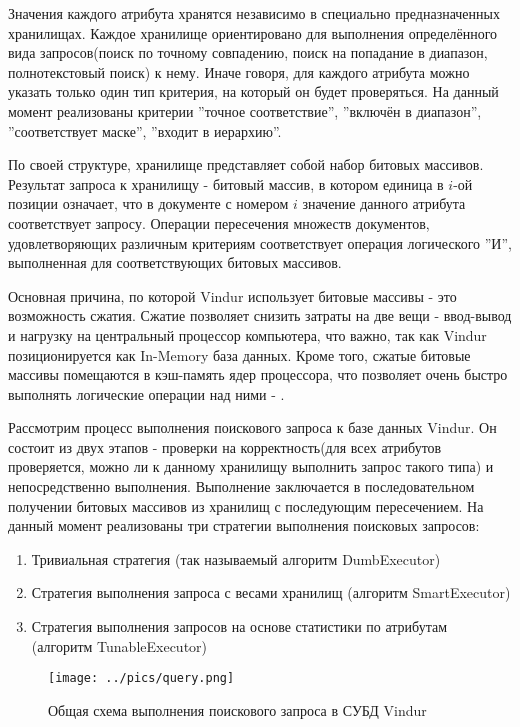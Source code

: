 \documentclass{matmex-diploma}
\begin{document}
    Значения каждого атрибута хранятся независимо в специально предназначенных хранилищах. Каждое хранилище ориентировано для выполнения определённого вида запросов(поиск по точному совпадению, поиск на попадание в диапазон, полнотекстовый поиск) к нему. Иначе говоря, для каждого атрибута можно указать только один тип критерия, на который он будет проверяться. На данный момент реализованы критерии ''точное соответствие'', ''включён в диапазон'', ''соответствует маске'', ''входит в иерархию''. 

    По своей структуре, хранилище представляет собой набор битовых массивов. Результат запроса к хранилищу - битовый массив, в котором единица в $i$-ой позиции означает, что в документе с номером $i$ значение данного атрибута соответствует запросу. Операции пересечения множеств документов, удовлетворяющих различным критериям соответствует операция логического ''И'', выполненная для соответствующих битовых массивов.
    
    Основная причина, по которой Vindur использует битовые массивы - это возможность сжатия. Сжатие позволяет снизить затраты на две вещи - ввод-вывод и нагрузку на центральный процессор компьютера, что важно, так как Vindur позиционируется как In-Memory база данных. Кроме того, сжатые битовые массивы помещаются в кэш-память ядер процессора, что позволяет очень быстро выполнять логические операции над ними - \cite{lemire2010sorting}. 
    
    Рассмотрим процесс выполнения поискового запроса к базе данных Vindur. Он состоит из двух этапов - проверки на корректность(для всех атрибутов проверяется, можно ли к данному хранилищу выполнить запрос такого типа) и непосредственно выполнения. Выполнение заключается в последовательном получении битовых массивов из хранилищ с последующим пересечением. На данный момент реализованы три стратегии выполнения поисковых запросов:
    \begin{enumerate}
        \item Тривиальная стратегия (так называемый алгоритм DumbExecutor)
        \item Стратегия выполнения запроса с весами хранилищ (алгоритм SmartExecutor)
        \item Стратегия выполнения запросов на основе статистики по атрибутам (алгоритм TunableExecutor)
    \end{enumerate}
    
    \begin{figure}[H]
        \label{query}
        \centering
        \texttt{[image: ../pics/query.png]}
        \caption{Общая схема выполнения поискового запроса в СУБД Vindur}
    \end{figure}
\end{document}
